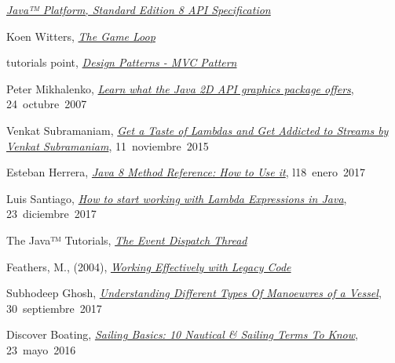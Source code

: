 


\href{https://docs.oracle.com/javase/8/docs/api/}{\textit{Java™ Platform, Standard Edition 8
		API Specification}}

Koen Witters,
\href{https://dewitters.com/dewitters-gameloop/}{\textit{The Game Loop}}

tutorials point,
\href{https://www.tutorialspoint.com/design_pattern/mvc_pattern.htm}{\textit{Design Patterns - MVC Pattern}}

Peter Mikhalenko,
\href{https://www.techrepublic.com/blog/software-engineer/learn-what-the-java-2d-api-graphics-package-offers/}{\textit{Learn what the Java 2D API graphics package offers}},
\mbox{24 octubre 2007}

Venkat Subramaniam,
\href{https://youtu.be/1OpAgZvYXLQ}{\textit{Get a Taste of Lambdas and Get Addicted to Streams by Venkat Subramaniam}},
\mbox{11 noviembre 2015}

Esteban Herrera,
\href{https://www.codementor.io/eh3rrera/using-java-8-method-reference-du10866vx}{\textit{Java 8 Method Reference: How to Use it}},
\mbox{l18 enero 2017}

Luis Santiago,
\href{https://www.freecodecamp.org/news/learn-these-4-things-and-working-with-lambda-expressions-b0ab36e0fffc/}{\textit{How to start working with Lambda Expressions in Java}},
\mbox{23 diciembre 2017}

The Java™ Tutorials,
\href{https://docs.oracle.com/javase/tutorial/uiswing/concurrency/dispatch.html}{\textit{The Event Dispatch Thread}}

Feathers, M., (2004),
\href{https://www.amazon.com/Working-Effectively-Legacy-Michael-Feathers/dp/0131177052}{\textit{Working Effectively with Legacy Code}}

Subhodeep Ghosh,
\href{https://www.marineinsight.com/naval-architecture/different-types-of-manoeuvres-of-a-vessel/}{\textit{Understanding Different Types Of Manoeuvres of a Vessel}},
\mbox{30 septiembre 2017}

Discover Boating,
\href{https://www.discoverboating.com/resources/sailing-basics-10-nautical-sailing-terms-to-know}{\textit{Sailing Basics: 10 Nautical \& Sailing Terms To Know}},
\mbox{23 mayo 2016}

